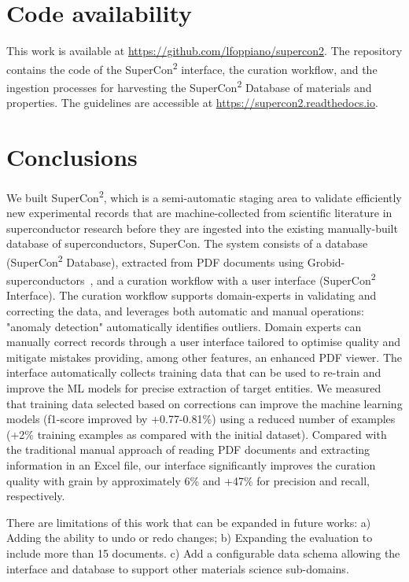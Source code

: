 \documentclass[]{interact}
\theoremstyle{plain} %
\theoremstyle{definition}
\theoremstyle{remark}
\begin{document}
\section{Code availability}
This work is available at \url{https://github.com/lfoppiano/supercon2}. The repository contains the code of the SuperCon\textsuperscript{2} interface, the curation workflow, and the ingestion processes for harvesting the SuperCon\textsuperscript{2} Database of materials and properties. The guidelines are accessible at \url{https://supercon2.readthedocs.io}.

\section{Conclusions}
We built SuperCon\textsuperscript{2}, which is a semi-automatic staging area to validate efficiently new experimental records that are machine-collected from scientific literature in superconductor research before they are ingested into the existing manually-built database of superconductors, SuperCon. 
The system consists of a database (SuperCon\textsuperscript{2} Database), extracted from PDF documents using Grobid-superconductors~\cite{lfoppiano2023automatic}, and a curation workflow with a user interface (SuperCon\textsuperscript{2} Interface).
The curation workflow supports domain-experts in validating and correcting the data, and leverages both automatic and manual operations: "anomaly detection" automatically identifies outliers. Domain experts can manually correct records through a user interface tailored to optimise quality and mitigate mistakes providing, among other features, an enhanced PDF viewer.
The interface automatically collects training data that can be used to re-train and improve the ML models for precise extraction of target entities. 
We measured that training data selected based on corrections can improve the machine learning models (f1-score improved by +0.77-0.81\%) using a reduced number of examples (+2\% training examples as compared with the initial dataset).
Compared with the traditional manual approach of reading PDF documents and extracting information in an Excel file, our interface significantly improves the curation quality with grain by approximately 6\% and +47\% for precision and recall, respectively.

There are limitations of this work that can be expanded in future works: a) Adding the ability to undo or redo changes; b) Expanding the evaluation to include more than 15 documents. c) Add a configurable data schema allowing the interface and database to support other materials science sub-domains. 
\end{document}
